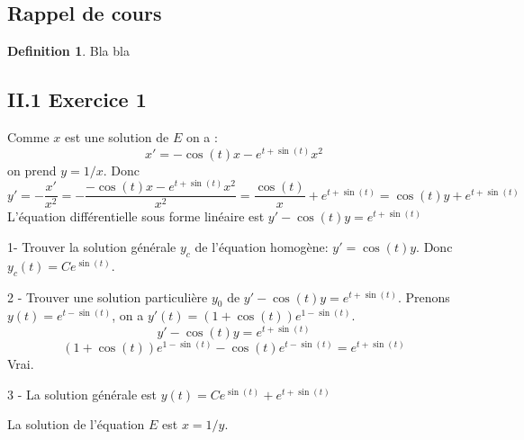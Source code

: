 \documentclass[]{book}
\theoremstyle{definition}
\newtheorem{defn}{Definition}
\begin{document}
\subsection*{Rappel de cours}
\begin{defn}
Bla bla
\end{defn}



\newpage
\subsection*{II.1 Exercice 1}

Comme $x$ est une solution de $E$ on a :
$$
x'= -\cos(t)x -e^{t+\sin(t)}x^2
$$
on prend $y=1/x$. Donc
$$
y'=-\frac{x'}{x^2} = -\frac{-\cos(t)x -e^{t+\sin(t)}x^2}{x^{2}} = \frac{\cos(t)}{x} + e^{t+\sin(t)} = \cos(t)y + e^{t+\sin(t)}
$$
L'\'equation diff\'erentielle sous forme lin\'eaire est $y'- \cos(t)y = e^{t+\sin(t)} $

1- Trouver la solution g\'en\'erale $y_c$ de l'\'equation homog\`ene: $y' = \cos(t)y$. Donc $y_c(t) = Ce^{\sin(t)}$. 

2 - Trouver une solution particuli\`ere $y_0$ de $y'- \cos(t)y = e^{t+\sin(t)}$. Prenons $y(t)=e^{t-\sin(t)}$, on a $y'(t)=(1+\cos(t))e^{1-\sin(t)}$. 
$$
y'- \cos(t)y = e^{t+\sin(t)}
$$
$$
(1+\cos(t))e^{1-\sin(t)}- \cos(t)e^{t-\sin(t)} = e^{t+\sin(t)}
$$
Vrai.

3 - La solution g\'en\'erale est $y(t) = Ce^{\sin(t)} + e^{t+\sin(t)}$

La solution de l'\'equation $E$ est $x=1/y$.
\end{document}
